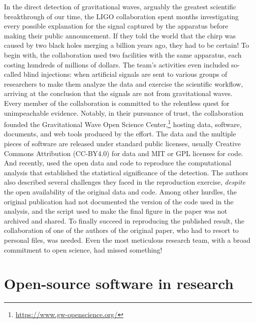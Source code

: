 \documentclass{statement}
\newlength{\up}
\begin{document}
In the direct detection of gravitational waves, arguably the greatest scientific breakthrough of our time, the LIGO collaboration spent months investigating every possible explanation for the signal captured by the apparatus before making their public announcement. 
If they told the world that the chirp was caused by two black holes merging a billion years ago, they had to be certain! 
To begin with, the collaboration used two facilities with the same apparatus, each costing hundreds of millions of dollars. 
The team's activities even included so-called blind injections: when artificial signals are sent to various groups of researchers to make them analyze the data and exercise the scientific workflow, arriving at the conclusion that the signals are not from gravitational waves. 
Every member of the collaboration is committed to the relentless quest for unimpeachable evidence. 
Notably, in their pursuance of trust, the collaboration founded the Gravitational Wave Open Science Center,\footnote{\url{https://www.gw-openscience.org/}} hosting data, software, documents, and web tools produced by the effort. 
The data and the multiple pieces of software are released under standard public licenses, usually Creative Commons Attribution (CC-BY4.0) for data and MIT or GPL licenses for code. 
And recently, \cite{brown2021} used the open data and code to reproduce the computational analysis that established the statistical significance of the detection. 
The authors also described several challenges they faced in the reproduction exercise, \emph{despite} the open availability of the original data and code. 
Among other hurdles, the original publication had not documented the version of the code used in the analysis, and the script used to make the final figure in the paper was not archived and shared. 
To finally succeed in reproducing the published result, the collaboration of one of the authors of the original paper, who had to resort to personal files, was needed. 
Even the most meticulous research team, with a broad commitment to open science, had missed something!

\section*{Open-source software in research}
\vspace{\up}
\end{document}
